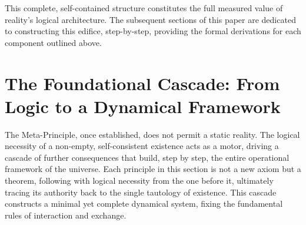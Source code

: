 This complete, self-contained structure constitutes the full measured value of reality's logical architecture. The subsequent sections of this paper are dedicated to constructing this edifice, step-by-step, providing the formal derivations for each component outlined above.

\begin{center}
\end{center}

\section{The Foundational Cascade: From Logic to a Dynamical Framework}

The Meta-Principle, once established, does not permit a static reality. The logical necessity of a non-empty, self-consistent existence acts as a motor, driving a cascade of further consequences that build, step by step, the entire operational framework of the universe. Each principle in this section is not a new axiom but a theorem, following with logical necessity from the one before it, ultimately tracing its authority back to the single tautology of existence. This cascade constructs a minimal yet complete dynamical system, fixing the fundamental rules of interaction and exchange.

